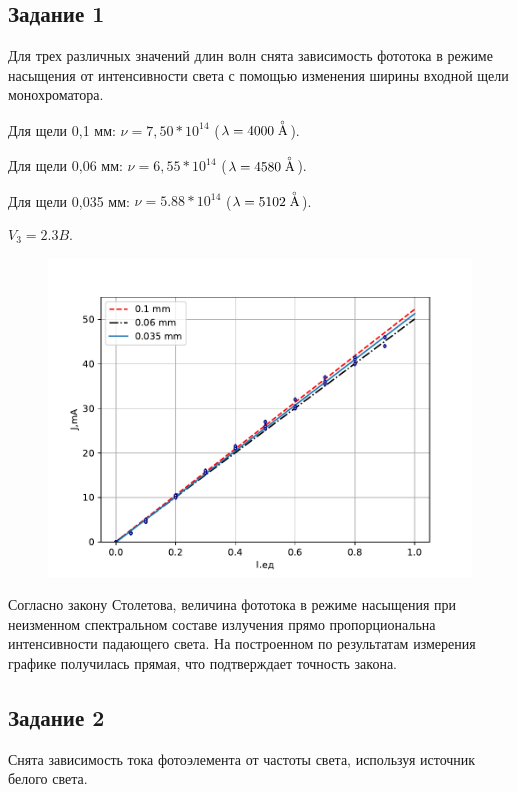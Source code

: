 \subsection{Задание 1}
Для трех различных значений длин волн снята зависимость фототока в режиме насыщения от интенсивности света с помощью изменения ширины входной щели монохроматора. 

Для щели 0,1 мм: $\nu=7,50*10^{14}$ ($\lambda=4000\buildrel _{\circ} \over {\mathrm{A}}$).

Для щели 0,06 мм: $\nu=6,55*10^{14}$ ($\lambda=4580\buildrel _{\circ} \over {\mathrm{A}}$).

Для щели 0,035 мм: $\nu=5.88*10^{14}$ ($\lambda=5102\buildrel _{\circ} \over {\mathrm{A}}$).

$V_3= 2.3 B.$

\begin{figure}[H]
    \centering
    \includegraphics[width=0.8\linewidth]{scripts/z11} 
    \caption{}
    \label{fig:4}
\end{figure}


Согласно закону Столетова, величина фототока в режиме насыщения при неизменном спектральном составе излучения прямо пропорциональна интенсивности падающего света. На построенном по результатам измерения графике получилась прямая, что подтверждает точность закона.

\subsection{Задание 2}
Снята зависимость тока фотоэлемента от частоты света, используя источник белого света.

